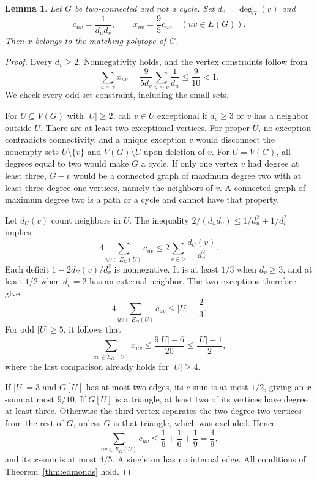 \documentclass[11pt]{article}
\newtheorem{lemma}[theorem]{Lemma}
\theoremstyle{remark}\newtheorem{remark}[theorem]{Remark}
\begin{document}
\begin{lemma}\label{lem:matching}
Let $G$ be two-connected and not a cycle. Set $d_v=\deg_G(v)$ and
\[
c_{uv}=\frac1{d_ud_v},\qquad x_{uv}=\frac95 c_{uv}\quad(uv\in E(G)).
\]
Then $x$ belongs to the matching polytope of $G$.
\end{lemma}
\begin{proof}
Every $d_v\ge2$. Nonnegativity holds, and the vertex constraints follow
from
\[
\sum_{u\sim v}x_{uv}=\frac9{5d_v}\sum_{u\sim v}\frac1{d_u}
\le\frac9{10}<1.
\]
We check every odd-set constraint, including the small sets.

For $U\subseteq V(G)$ with $|U|\ge2$, call $v\in U$ exceptional if
$d_v\ge3$ or $v$ has a neighbor outside $U$. There are at least two
exceptional vertices. For proper $U$, no exception contradicts
connectivity, and a unique exception $v$ would disconnect the nonempty
sets $U\setminus\{v\}$ and $V(G)\setminus U$ upon deletion of $v$.
For $U=V(G)$, all degrees equal to two would make $G$ a cycle.
If only one vertex $v$ had degree at least three, $G-v$ would be a
connected graph of maximum degree two with at least three degree-one
vertices, namely the neighbors of $v$. A connected graph of maximum
degree two is a path or a cycle and cannot have that property.

Let $d_U(v)$ count neighbors in $U$. The inequality
$2/(d_ud_v)\le1/d_u^2+1/d_v^2$ implies
\[
4\sum_{uv\in E_G(U)}c_{uv}\le2\sum_{v\in U}\frac{d_U(v)}{d_v^2}.
\]
Each deficit $1-2d_U(v)/d_v^2$ is nonnegative. It is at least $1/3$
when $d_v\ge3$, and at least $1/2$ when $d_v=2$ has an external
neighbor. The two exceptions therefore give
\begin{equation}\label{eq:deficit}
4\sum_{uv\in E_G(U)}c_{uv}\le |U|-\frac23.
\end{equation}
For odd $|U|\ge5$, it follows that
\[
\sum_{uv\in E_G(U)}x_{uv}\le\frac{9|U|-6}{20}
\le\frac{|U|-1}{2},
\]
where the last comparison already holds for $|U|\ge4$.

If $|U|=3$ and $G[U]$ has at most two edges, its $c$-sum is at most
$1/2$, giving an $x$-sum at most $9/10$. If $G[U]$ is a triangle,
at least two of its vertices have degree at least three. Otherwise the
third vertex separates the two degree-two vertices from the rest of
$G$, unless $G$ is that triangle, which was excluded. Hence
\[
\sum_{uv\in E_G(U)}c_{uv}\le\frac16+\frac16+\frac19=\frac49,
\]
and its $x$-sum is at most $4/5$. A singleton has no internal edge.
All conditions of Theorem~\ref{thm:edmonds} hold.
\end{proof}
\end{document}
